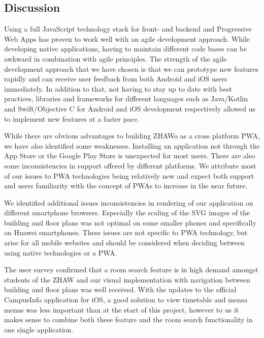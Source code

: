 \begin{markdown}
\section{Discussion} \label{discussion}

Using a full JavaScript technology stack for front- and backend and Progressive Web Apps has proven to work well with an agile development approach. While developing native applications, having to maintain different code bases can be awkward in combination with agile principles. The strength of the agile development approach that we have chosen is that we can prototype new features rapidly and can receive user feedback from both Android and iOS users immediately. In addition to that, not having to stay up to date with best practices, libraries and frameworks for different languages such as Java/Kotlin and Swift/Objective C for Android and iOS development respectively allowed us to implement new features at a faster pace.

While there are obvious advantages to building ZHAWo as a cross platform PWA, we have also identified some weaknesses. Installing an application not through the App Store or the Google Play Store is unexpected for most users. There are also some inconsistencies in support offered by different platforms. We attribute most of our issues to PWA technologies being relatively new and expect both support and users familiarity with the concept of PWAs to increase in the near future. 

We identified additional issues inconsistencies in rendering of our application on different smartphone browsers. Especially the scaling of the SVG images of the building and floor plans was not optimal on some smaller phones and specifically on Huawei smartphones. These issues are not specific to PWA technology, but arise for all mobile websites and should be considered when deciding between using native technologies or a PWA.

The user survey confirmed that a room search feature is in high demand amongst students of the ZHAW and our visual implementation with navigation between building and floor plans was well received. With the updates to the official CampusInfo application for iOS, a good solution to view timetable and mensa menus was less important than at the start of this project, however to us it makes sense to combine both these feature and the room search functionality in one single application.

\end{markdown}

